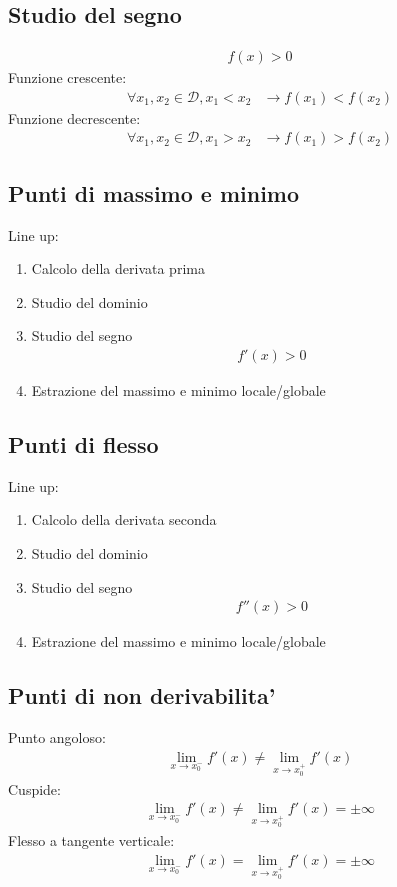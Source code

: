 \documentclass[a4paper]{article}
\begin{document}
		\subsection{Studio del segno}
		\begin{align*}
			f(x) > 0
		\end{align*}
		Funzione crescente:
		\begin{align*}
			\forall x_1,x_2 \in \mathcal{D}, x_1 < x_2 &\to f(x_1)<f(x_2)
		\end{align*}
		Funzione decrescente:
		\begin{align*}
			\forall x_1,x_2 \in \mathcal{D}, x_1 > x_2 &\to f(x_1)>f(x_2)
		\end{align*}

		\subsection{Punti di massimo e minimo}
		Line up:
		\begin{enumerate}
			\item Calcolo della derivata prima
			\item Studio del dominio
			\item Studio del segno
			\begin{align*}
				f'(x) > 0
			\end{align*}
			\item Estrazione del massimo e minimo locale/globale 
		\end{enumerate}
		
		
		\subsection{Punti di flesso}
		Line up:
		\begin{enumerate}
			\item Calcolo della derivata seconda
			\item Studio del dominio
			\item Studio del segno
			\begin{align*}
			f''(x) > 0
			\end{align*}
			\item Estrazione del massimo e minimo locale/globale 
		\end{enumerate}		
	\newpage
	\subsection{Punti di non derivabilita'}
	Punto angoloso:
	\begin{align*}
		\lim\limits_{x \to x_0^-}f'(x) \ne \lim\limits_{x \to x_0^+}f'(x)
	\end{align*}
	Cuspide:
	\begin{align*}
		\lim\limits_{x \to x_0^-}f'(x) \ne \lim\limits_{x \to x_0^+}f'(x) = \pm \infty
	\end{align*}
	Flesso a tangente verticale:
	\begin{align*}
		\lim\limits_{x \to x_0^-}f'(x) = \lim\limits_{x \to x_0^+}f'(x) = \pm \infty
	\end{align*}
	
\end{document}
